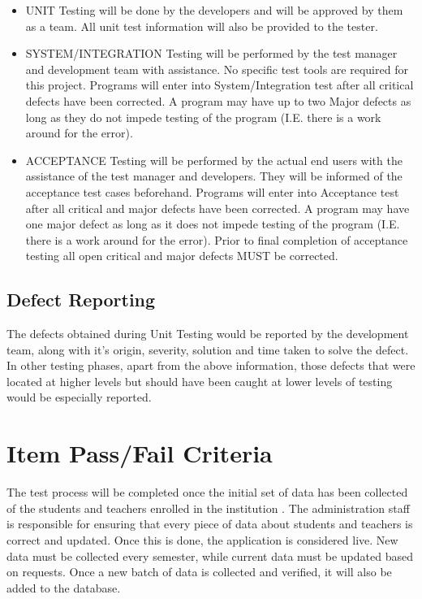 \documentclass{scrreprt}
\begin{document}
\begin{itemize}
    \item UNIT Testing will be done by the developers and will be approved by them as a team. All unit test information will also be provided to the tester.
    \item SYSTEM/INTEGRATION Testing will be performed by the test manager and development team with assistance. No specific test tools are required for this project. Programs will enter into System/Integration test after all critical defects have been corrected. A program may have up to two Major defects as long as they do not impede testing of the program (I.E. there is a work around for the error).
    \item ACCEPTANCE Testing will be performed by the actual end users with the assistance of the test manager and developers. They will be informed of the acceptance test cases beforehand. Programs will enter into Acceptance test after all critical and major defects have been corrected. A program may have one major defect as long as it does not impede testing of the program (I.E. there is a work around for the error). Prior to final completion of acceptance testing all open critical and major defects MUST be corrected.
\end{itemize}

\section{Defect Reporting}
The defects obtained during Unit Testing would be reported by the development team, along with it's origin, severity, solution and time taken to solve the defect. \\
In other testing phases, apart from the above information, those defects that were located at higher levels but should have been caught at lower levels of testing would be especially reported.


\chapter{Item Pass/Fail Criteria}
The test process will be completed once the initial set of data has been collected of the students and teachers enrolled in the institution . The administration staff is responsible for ensuring that every piece of data about students and teachers is correct and updated. Once this is done, the application is considered live. New data must be collected every semester, while current data must be updated based on requests. Once a new batch of data is collected and verified, it will also be added to the database.
\end{document}
